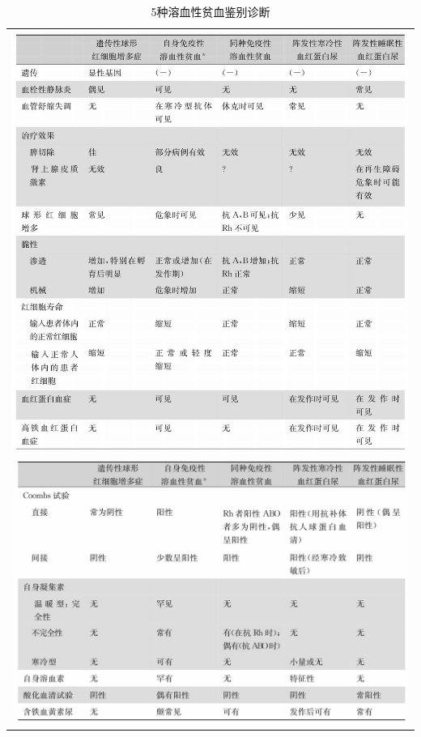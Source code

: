 \begin{longtable}{c}
 \caption{5种溶血性贫血鉴别诊断}
 \label{tab33-9}
 \endfirsthead
 \caption[]{5种溶血性贫血鉴别诊断}
 \endhead
 \includegraphics[width=\textwidth,height=\textheight,keepaspectratio]{./images/Image00181.jpg}\\
 \includegraphics[width=\textwidth,height=\textheight,keepaspectratio]{./images/Image00182.jpg}
 \end{longtable}



